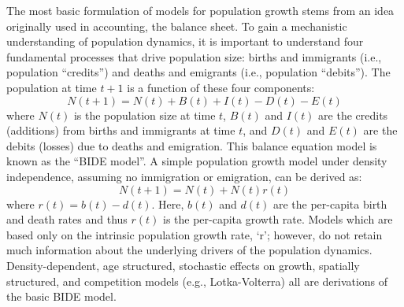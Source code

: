 The most basic formulation of models for population growth stems from an idea originally used
in accounting, the balance sheet.  To gain a mechanistic understanding of population dynamics, it is 
important to understand four fundamental processes that drive 
population size: births and immigrants (i.e., population ``credits'') and deaths and
emigrants (i.e., population ``debits'').  The population at time $t+1$ is a
function of these four components:
\[
N(t+1) = N(t) + B(t) + I(t) - D(t) - E(t)
\]
where $N(t)$ is the population size at time $t$, $B(t)$ and $I(t)$ are the credits (additions) from births and
immigrants at time $t$, and $D(t)$ and $E(t)$ are the debits (losses) due to deaths and emigration.   This balance
equation model is 
known as
the ``BIDE model''.  A simple population growth model under density independence, assuming no immigration or emigration,
can be derived as:
\[
N(t+1) = N(t) + N(t)r(t)
\]
where $r(t) = b(t) - d(t)$.  Here, $b(t)$ and $d(t)$ are the per-capita birth and death rates and thus $r(t)$ is the per-capita
growth rate. Models which are based only on the intrinsic population growth rate, `r'; 
however, do not retain much information 
about the underlying drivers of the population dynamics. 
Density-dependent, age structured, stochastic effects on
growth, spatially structured, and competition models (e.g., Lotka-Volterra)
all are derivations of the basic BIDE model.  

